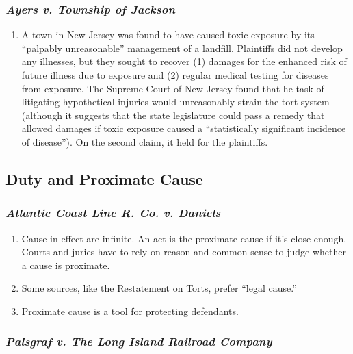 \subsubsection{\emph{Ayers v. Township of Jackson}}

\begin{enumerate}
    \item A town in New Jersey was found to have caused toxic exposure by its ``palpably unreasonable'' management of a landfill. Plaintiffs did not develop any illnesses, but they sought to recover (1) damages for the enhanced risk of future illness due to exposure and (2) regular medical testing for diseases from exposure. The Supreme Court of New Jersey found that he task of litigating hypothetical injuries would unreasonably strain the tort system (although it suggests that the state legislature could pass a remedy that allowed damages if toxic exposure caused a ``statistically significant incidence of disease''). On the second claim, it held for the plaintiffs.
\end{enumerate}

\subsection{Duty and Proximate Cause}

\subsubsection{\emph{Atlantic Coast Line R. Co. v. Daniels}}

\begin{enumerate}
    \item Cause in effect are infinite. An act is the proximate cause if it's close enough. Courts and juries have to rely on reason and common sense to judge whether a cause is proximate.
    \item Some sources, like the Restatement on Torts, prefer ``legal cause.''
    \item Proximate cause is a tool for protecting defendants.
\end{enumerate}

\subsubsection{\emph{Palsgraf v. The Long Island Railroad Company}}

